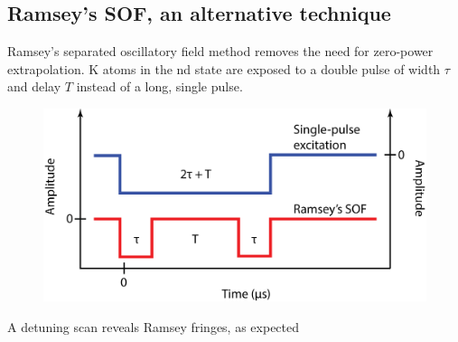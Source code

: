 \documentclass[landscape]{sciposter}
\begin{document}
\begin{multicols}{4}
\section*{\large Ramsey's SOF, an alternative technique}
Ramsey's separated oscillatory field method removes the need for zero-power extrapolation. K atoms in the nd state are exposed to a double pulse of width $\tau$ and delay $T$ instead of a long, single pulse. 

\begin{figure}
\begin{center}
\includegraphics[scale=1]{Ramsey_excitation.png}
\caption{}
\label{excitation scheme}
\end{center}
\end{figure}

A detuning scan reveals Ramsey fringes, as expected


\end{multicols}
\end{document}
